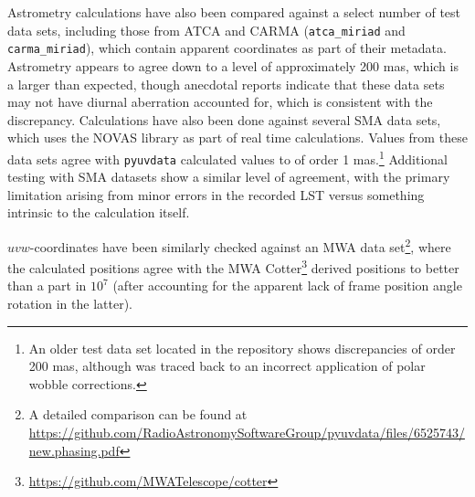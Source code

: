 \documentclass[11pt, oneside]{article}
\begin{document}
Astrometry calculations have also been compared against a select number of test data sets, including those from ATCA and CARMA (\verb!atca_miriad! and \verb!carma_miriad!), which contain apparent coordinates as part of their metadata. Astrometry appears to agree down to a level of approximately 200 mas, which is a larger than expected, though anecdotal reports indicate that these data sets may not have diurnal aberration accounted for, which is consistent with the discrepancy. Calculations have also been done against several SMA data sets, which uses the NOVAS library as part of real time calculations. Values from these data sets agree with \texttt{pyuvdata} calculated values to of order 1 mas.\footnote{An older test data set located in the repository shows discrepancies of order 200 mas, although was traced back to an incorrect application of polar wobble corrections.} Additional testing with SMA datasets show a similar level of agreement, with the primary limitation arising from minor errors in the recorded LST versus something intrinsic to the calculation itself.

$uvw$-coordinates have been similarly checked against an MWA data set\footnote{A detailed comparison can be found at \url{https://github.com/RadioAstronomySoftwareGroup/pyuvdata/files/6525743/new.phasing.pdf}}, where the calculated positions agree with the MWA Cotter\footnote{\url{https://github.com/MWATelescope/cotter}} derived positions to better than a part in $10^7$ (after accounting for the apparent lack of frame position angle rotation in the latter).

%
% 


 
\end{document}
